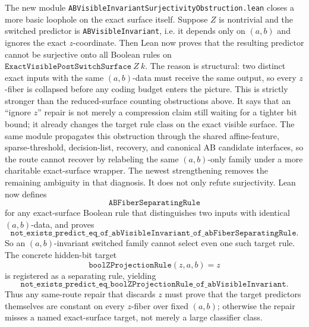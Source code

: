 \documentclass[11pt]{article}
\theoremstyle{remark}
\begin{document}
The new module \texttt{ABVisibleInvariantSurjectivityObstruction.lean} closes a
more basic loophole on the exact surface itself.  Suppose \(Z\) is nontrivial
and the switched predictor is \texttt{ABVisibleInvariant}, i.e. it depends only
on \((a,b)\) and ignores the exact \(z\)-coordinate.  Then Lean now proves that
the resulting predictor cannot be surjective onto all Boolean rules on
\(\texttt{ExactVisiblePostSwitchSurface}\ Z\ k\).  The reason is structural:
two distinct exact inputs with the same \((a,b)\)-data must receive the same
output, so every \(z\)-fiber is collapsed before any coding budget enters the
picture.  This is strictly stronger than the reduced-surface counting
obstructions above.  It says that an ``ignore \(z\)'' repair is not merely a
compression claim still waiting for a tighter bit bound; it already changes the
target rule class on the exact visible surface.  The same module propagates
this obstruction through the shared affine-feature, sparse-threshold,
decision-list, recovery, and canonical AB candidate interfaces, so the route
cannot recover by relabeling the same \((a,b)\)-only family under a more
charitable exact-surface wrapper.
The newest strengthening removes the remaining ambiguity in that diagnosis.  It
does not only refute surjectivity.  Lean now defines
\[
  \texttt{ABFiberSeparatingRule}
\]
for any exact-surface Boolean rule that distinguishes two inputs with identical
\((a,b)\)-data, and proves
\[
  \texttt{not\_exists\_predict\_eq\_of\_abVisibleInvariant\_of\_abFiberSeparatingRule}.
\]
So an \((a,b)\)-invariant switched family cannot select even one such target
rule.  The concrete hidden-bit target
\[
  \texttt{boolZProjectionRule}(z,a,b)=z
\]
is registered as a separating rule, yielding
\[
  \texttt{not\_exists\_predict\_eq\_boolZProjectionRule\_of\_abVisibleInvariant}.
\]
Thus any same-route repair that discards \(z\) must prove that the target
predictors themselves are constant on every \(z\)-fiber over fixed \((a,b)\);
otherwise the repair misses a named exact-surface target, not merely a large
classifier class.
\end{document}
